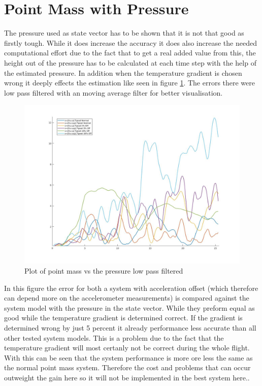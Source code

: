 \section{Point Mass with Pressure}
The pressure used as state vector has to be shown that it is not that good as firstly tough.
While it does increase the accuracy it does also increase the needed computational effort due to the fact that to get a real added value from this,
the height out of the pressure has to be calculated at each time step with the help of the estimated pressure.
In addition when the temperature gradient is chosen wrong it deeply effects the estimation like seen in figure \ref{fig:PointMassVSPressure}.
The errors there were low pass filtered with an moving average filter for better visualisation.

\begin{figure}[h!]
 \centering
 \includegraphics[width=.8 \textwidth]{./Pictures/PointMassVSPressure.jpg}
 \caption{Plot of point mass vs the pressure low pass filtered}
 \label{fig:PointMassVSPressure}
\end{figure}

In this figure the error for both a system with acceleration offset (which therefore can depend more on the accelerometer measurements) is compared against the system model with the pressure in the state vector.
While they preform equal as good while the temperature gradient is determined correct.
If the gradient is determined wrong by just 5 percent it already performance less accurate than all other tested system models.
This is a problem due to the fact that the temperature gradient will most certanly not be correct during the whole flight.
With this can be seen that the system performance is more ore less the same as the normal point mass system.
Therefore the cost and problems that can occur outweight the gain here so it will not be implemented in the best system here..



